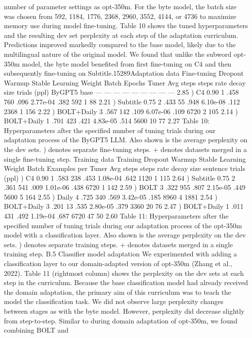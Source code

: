 number of parameter settings as opt-350m. For the
byte model, the batch size was chosen from 592,
1184, 1776, 2368, 2960, 3552, 4144, or 4736 to
maximize memory use during model fine-tuning.
Table 10 shows the tuned hyperparameters and
the resulting dev set perplexity at each step of
the adaptation curriculum. Predictions improved
markedly compared to the base model, likely due
to the multilingual nature of the original model. We
found that unlike the subword opt-350m model, the
byte model benefited from first fine-tuning on C4
and then subsequently fine-tuning on Subtitle.15289Adaptation data Fine-tuning Dropout Warmup Stable Learning Weight Batch Epochs Tuner Avg
steps steps rate decay size trials (ppl)
ByGPT5 base — — — — — — — — — 2.85
) C4 0.90 1 .458 760 .096 2.77e-04 .382 592 1 88 2.21
) Subtitle 0.75 2 .433 55 .948 6.10e-08 .112 2368 1 156 2.22
) BOLT+Daily 3 .567 142 .109 6.07e-06 .109 6720 2 105 2.14
) BOLT+Daily 1 .701 423 .421 4.83e-05 .514 5600 10 77 2.27
Table 10: Hyperparameters after the specified number of tuning trials during our adaptation process of the ByGPT5
LLM. Also shown is the average perplexity on the dev sets. ) denotes separate fine-tuning steps. + denotes datasets
merged in a single fine-tuning step.
Training data Training Dropout Warmup Stable Learning Weight Batch Examples per Tuner Avg
steps steps rate decay size sentence trials (ppl)
) C4 0.90 1 .583 238 .453 1.08e-04 .642 1120 1 115 2.64
) Subtitle 0.75 2 .361 541 .009 1.01e-06 .438 6720 1 142 2.59
) BOLT 3 .322 955 .807 2.15e-05 .449 5600 5 164 2.55
) Daily 4 .725 340 .569 3.42e-05 .185 8960 4 1881 2.54
) BOLT+Daily 3 .201 13 .535 2.80e-05 .379 3360 20 76 2.47
) BOLT+Daily 1 .011 431 .492 1.19e-04 .687 6720 47 50 2.60
Table 11: Hyperparameters after the specified number of tuning trials during our adaptation process of the opt-350m
model with a classification layer. Also shown is the average perplexity on the dev sets. ) denotes separate training
steps. + denotes datasets merged in a single training step.
B.5 Classifier model adaptation
We experimented with adding a classification layer
to our domain-adapted version of opt-350m (Zhang
et al., 2022). Table 11 (rightmost column) shows
the perplexity on the dev sets at each step in the
curriculum. Because the base classification model
had already received the domain adaptation, the primary aim of this curriculum was to teach the model
the classification task. We did not observe large
perplexity changes between stages as with the byte
model. However, perplexity did decrease slightly
from step-to-step. Similar to during domain adaptation of opt-350m, we found combining BOLT and
